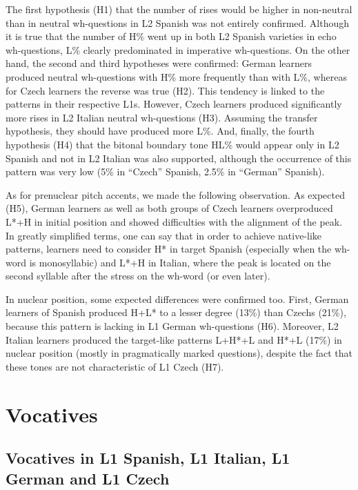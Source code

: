 The first hypothesis ({H1}) that the number of rises would be higher in non-neutral than in neutral wh-questions in L2 Spanish was not entirely confirmed. Although it is true that the number of H\% went up in both L2 Spanish varieties in echo wh-questions, L\% clearly predominated in imperative wh-questions. On the other hand, the second and third hypotheses were confirmed: German learners produced neutral wh-questions with H\% more frequently than with L\%, whereas for Czech learners the reverse was true ({H2}). This tendency is linked to the patterns in their respective L1s. However, Czech learners produced significantly more rises in L2 Italian neutral wh-questions ({H3}). Assuming the transfer hypothesis, they should have produced more L\%. And, finally, the fourth hypothesis ({H4}) that the bitonal boundary tone HL\% would appear only in L2 Spanish and not in L2 Italian was also supported, although the occurrence of this pattern was very low (5\% in “Czech” Spanish, 2.5\% in “German” Spanish).



As for prenuclear pitch accents, we made the following observation. As expected ({H5}), German learners as well as both groups of Czech learners overproduced L*+H in initial position and showed difficulties with the alignment of the peak. In greatly simplified terms, one can say that in order to achieve native-like patterns, learners need to consider H* in target Spanish (especially when the wh-word is monosyllabic) and L*+H in Italian, where the peak is located on the second syllable after the stress on the wh-word (or even later).



In nuclear position, some expected differences were confirmed too. First, German learners of Spanish produced H+L* to a lesser degree (13\%) than Czechs (21\%), because this pattern is lacking in L1 German wh-questions ({H6}). Moreover, L2 Italian learners produced the target-like patterns L+H*+L and H*+L (17\%) in nuclear position (mostly in pragmatically marked questions), despite the fact that these tones are not characteristic of L1 Czech ({H7}).


\section{Vocatives}\label{sec:4.5}
\subsection{Vocatives in L1 Spanish, L1 Italian, L1 German and L1 Czech}\label{sec:4.5.1}

